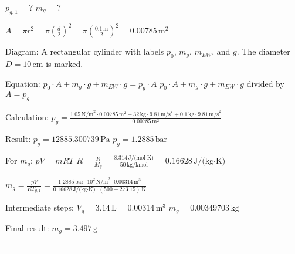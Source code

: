 \( p_{g,1} = ? \)  
\( m_{g} = ? \)  

\( A = \pi r^2 = \pi \left( \frac{d}{2} \right)^2 = \pi \left( \frac{0.1 \, \text{m}}{2} \right)^2 = 0.00785 \, \text{m}^2 \)  

Diagram: A rectangular cylinder with labels \( p_0 \), \( m_{g} \), \( m_{EW} \), and \( g \). The diameter \( D = 10 \, \text{cm} \) is marked.  

Equation:  
\( p_0 \cdot A + m_{g} \cdot g + m_{EW} \cdot g = p_{g} \cdot A \)  
\( p_0 \cdot A + m_{g} \cdot g + m_{EW} \cdot g \) divided by \( A = p_{g} \)  

Calculation:  
\( p_{g} = \frac{1.05 \, \text{N/m}^2 \cdot 0.00785 \, \text{m}^2 + 32 \, \text{kg} \cdot 9.81 \, \text{m/s}^2 + 0.1 \, \text{kg} \cdot 9.81 \, \text{m/s}^2}{0.00785 \, \text{m}^2} \)  

Result:  
\( p_{g} = 12885.300739 \, \text{Pa} \)  
\( p_{g} = 1.2885 \, \text{bar} \)  

For \( m_{g} \):  
\( pV = mRT \)  
\( R = \frac{\bar{R}}{M_g} = \frac{8.314 \, \text{J/(mol·K)}}{50 \, \text{kg/kmol}} = 0.16628 \, \text{J/(kg·K)} \)  

\( m_{g} = \frac{pV}{R T_{g,1}} = \frac{1.2885 \, \text{bar} \cdot 10^2 \, \text{N/m}^2 \cdot 0.00314 \, \text{m}^3}{0.16628 \, \text{J/(kg·K)} \cdot (500 + 273.15) \, \text{K}} \)  

Intermediate steps:  
\( V_{g} = 3.14 \, \text{L} = 0.00314 \, \text{m}^3 \)  
\( m_{g} = 0.00349703 \, \text{kg} \)  

Final result:  
\( m_{g} = 3.497 \, \text{g} \)  

---